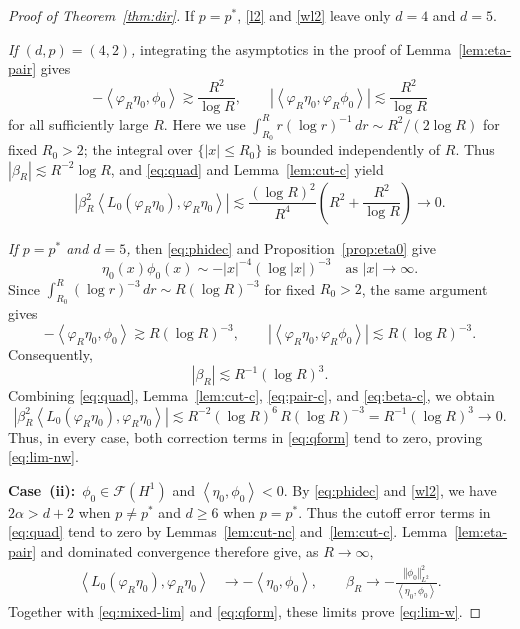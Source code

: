\documentclass[12pt, a4paper, reqno]{amsart}
\numberwithin{equation}{section}
\theoremstyle{definition}
\theoremstyle{remark}
\newcommand{\cF}{\mathcal F}
\def\tbra[#1,#2]{{\left\langle #1,#2\right\rangle}}
\def\norm[#1]{{\left\Vert #1 \right\Vert}}
\def\abs[#1]{{\left\vert #1 \right\vert}}
\begin{document}
\begin{proof}[Proof of Theorem~\ref{thm:dir}]
If $p=p^*$, \eqref{l2} and \eqref{wl2} leave only $d=4$ and $d=5$.

\smallskip
\noindent\textit{If $(d,p)=(4,2)$,} integrating the asymptotics in
the proof of Lemma~\ref{lem:eta-pair} gives
\[
  -\tbra[\varphi_R\eta_0,\phi_0]
     \gtrsim\frac{R^2}{\log R},
  \qquad
  \abs[{\tbra[\varphi_R\eta_0,\varphi_R\phi_0]}]
     \lesssim\frac{R^2}{\log R}
\]
for all sufficiently large $R$. Here we use
$\int_{R_0}^R r(\log r)^{-1}\,dr\sim R^2/(2\log R)$ for fixed
$R_0>2$; the integral over $\{|x|\le R_0\}$ is bounded
independently of $R$. Thus $|\beta_R|\lesssim R^{-2}\log R$, and
\eqref{eq:quad} and Lemma~\ref{lem:cut-c} yield
\[
  \abs[{\beta_R^2
    \tbra[L_0(\varphi_R\eta_0),\varphi_R\eta_0]}]
  \lesssim \frac{(\log R)^2}{R^4}
       \left(R^2+\frac{R^2}{\log R}\right)\to0.
\]

\smallskip
\noindent\textit{If $p=p^*$ and $d=5$,} then \eqref{eq:phidec}
and Proposition~\ref{prop:eta0} give
\[
  \eta_0(x)\phi_0(x)
  \sim-|x|^{-4}(\log|x|)^{-3}
  \quad\text{as }|x|\to\infty.
\]
Since $\int_{R_0}^R(\log r)^{-3}\,dr\sim R(\log R)^{-3}$ for fixed
$R_0>2$, the same argument gives
\begin{equation}\label{eq:pair-c}
  -\tbra[\varphi_R\eta_0,\phi_0]
    \gtrsim R(\log R)^{-3},
  \qquad
  \abs[{\tbra[\varphi_R\eta_0,\varphi_R\phi_0]}]
    \lesssim R(\log R)^{-3}.
\end{equation}
Consequently,
\begin{equation}\label{eq:beta-c}
  |\beta_R|\lesssim R^{-1}(\log R)^3.
\end{equation}
Combining \eqref{eq:quad}, Lemma~\ref{lem:cut-c},
\eqref{eq:pair-c}, and \eqref{eq:beta-c}, we obtain
\[
  \abs[{\beta_R^2
    \tbra[L_0(\varphi_R\eta_0),\varphi_R\eta_0]}]
  \lesssim R^{-2}(\log R)^6\,R(\log R)^{-3}
  =R^{-1}(\log R)^3\to0.
\]
Thus, in every case, both correction terms in \eqref{eq:qform}
tend to zero, proving \eqref{eq:lim-nw}.

\medskip
\noindent\textbf{Case~\textup{(ii)}:}~$\phi_0\in\cF(H^1)$ and
$\tbra[\eta_0,\phi_0]<0$.
By \eqref{eq:phidec} and \eqref{wl2}, we have $2\alpha>d+2$ when
$p\ne p^*$ and $d\ge6$ when $p=p^*$. Thus the cutoff error terms
in \eqref{eq:quad} tend to zero by Lemmas~\ref{lem:cut-nc}
and~\ref{lem:cut-c}. Lemma~\ref{lem:eta-pair} and dominated
convergence therefore give, as $R\to\infty$,
\begin{align*}
  \tbra[L_0(\varphi_R\eta_0),\varphi_R\eta_0]
  &\to-\tbra[\eta_0,\phi_0],
 \qquad
  \beta_R
  \to-\frac{\norm[\phi_0]_{L^2}^2}
             {\tbra[\eta_0,\phi_0]}.
\end{align*}
Together with \eqref{eq:mixed-lim} and \eqref{eq:qform},
these limits prove \eqref{eq:lim-w}.
\end{proof}
\end{document}
